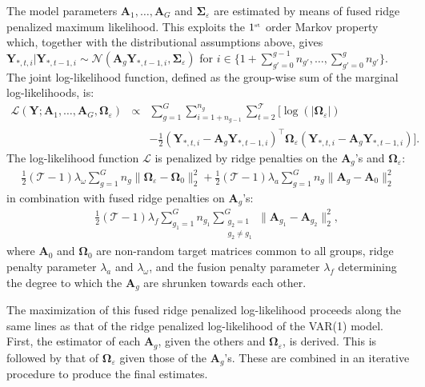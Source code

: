 The model parameters $\mathbf{A}_1, \ldots, \mathbf{A}_G$ and $\mathbf{\Sigma}_{\varepsilon}$ are estimated by means of fused ridge penalized maximum likelihood. This exploits the $1^{\mbox{{\tiny st}}}$ order Markov property which, together with the distributional assumptions above, gives \\ $\mathbf{Y}_{\ast,t,i}|\mathbf{Y}_{\ast,t-1,i} \sim \mathcal{N}\left(\mathbf{A}_g \mathbf{Y}_{\ast, t-1,i},\boldsymbol{\Sigma}_{\varepsilon}\right)$ for $i \in \{1+ \sum_{g'=0}^{g-1} n_{g'}, \ldots, \sum_{g'=0}^{g} n_{g'} \}$. The joint log-likelihood function, defined as the group-wise sum of the marginal log-likelihoods, is:
\begin{eqnarray*}
\mathcal{L}(\mathbf{Y};\mathbf{A}_1, \ldots, \mathbf{A}_G, \mathbf{\Omega}_{\varepsilon}) & \propto & \sum_{g=1}^{G} \sum_{i=1+n_{g-1}}^{n_g} \sum_{t=2}^{\mathcal{T}} \big[
\log ( |\mathbf{\Omega}_{\varepsilon} |)
\\
& &   - \frac{1}{2} ( \mathbf{Y}_{\ast,t,i}  - \mathbf{A}_g \mathbf{Y}_{\ast,t-1,i} )^\top \mathbf{\Omega}_{\varepsilon} ( \mathbf{Y}_{\ast,t,i} - \mathbf{A}_g \mathbf{Y}_{\ast,t-1,i} ) \big].
\end{eqnarray*}
The log-likelihood function $\mathcal{L}$ is penalized by ridge penalties on the $\mathbf{A}_g$'s and $\mathbf{\Omega}_{\varepsilon}$:
\begin{eqnarray*}
\tfrac{1}{2} (\mathcal{T} - 1) \lambda_{\omega} \sum_{g=1}^G n_g  \| \mathbf{\Omega}_{\varepsilon} - \mathbf{\Omega}_0 \|_2^2 + \tfrac{1}{2} (\mathcal{T} - 1) \lambda_a \sum_{g=1}^G n_g  \| \mathbf{A}_g -  \mathbf{A}_0 \|_2^2
\end{eqnarray*}
in combination with fused ridge penalties on $\mathbf{A}_g$'s:
\begin{eqnarray*}
&  &  \tfrac{1}{2} (\mathcal{T} - 1) \lambda_f \sum_{g_1=1}^G n_{g_1}   \sum_{ \substack{ g_2=1 \\ g_2 \not= g_1} }^G  \| \mathbf{A}_{g_1} - \mathbf{A}_{g_2} \|_2^2,
\end{eqnarray*}
where $\mathbf{A}_0$ and $\mathbf{\Omega}_0$ are non-random  target matrices common to all groups, ridge penalty parameter $\lambda_a$ and $\lambda_{\omega}$, and the fusion penalty parameter $\lambda_f$ determining the degree to which the $\mathbf{A}_g$ are shrunken towards each other.

The maximization of this fused ridge penalized log-likelihood proceeds along the same lines as that of the ridge penalized log-likelihood of the VAR(1) model. First, the estimator of each $\mathbf{A}_g$, given the others and $\mathbf{\Omega}_{\varepsilon}$, is derived. This is followed by that of $\mathbf{\Omega}_{\varepsilon}$ given those of the $\mathbf{A}_g$'s. These are combined in an iterative procedure to produce the final estimates. 

